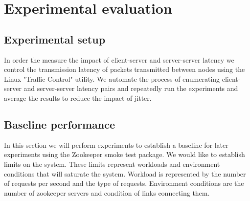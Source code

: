 \section{Experimental evaluation}\label{sec:eval}

\subsection{Experimental setup}
In order the measure the impact of client-server and server-server latency we control the transmission latency of packets transmitted between nodes using the Linux "Traffic Control" utility. We automate the process of enumerating client-server and server-server latency pairs and repeatedly run the experiments and average the results to reduce the impact of jitter.



\subsection{Baseline performance}
 In this section we will perform experiments to establish a baseline for later experiments using the Zookeeper smoke test package. We would like to establish limits on the system. These limits represent workloads and environment conditions that will saturate the system. Workload is represented by the number of requests per second and the type of requests. Environment conditions are the number of zookeeper servers and condition of links connecting them.

